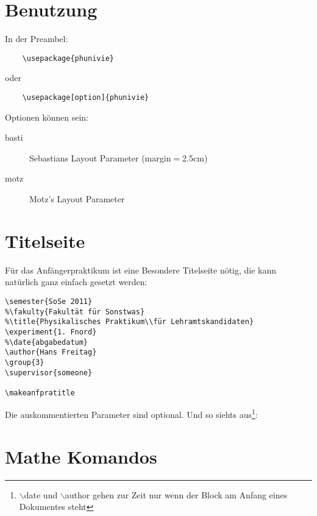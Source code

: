 \documentclass[a4paper]{article}
\begin{document}
\section{Benutzung}

In der Preambel:

\begin{verbatim}
	\usepackage{phunivie}
\end{verbatim}

oder

\begin{verbatim}
	\usepackage[option]{phunivie}
\end{verbatim}

Optionen können sein: 

\begin{description}
	\item[basti] Sebastians Layout Parameter (margin$=$2.5cm)
	\item[motz] Motz's Layout Parameter
\end{description}
	

\section{Titelseite}

Für das Anfängerpraktikum ist eine Besondere Titelseite nötig, die 
kann natürlich ganz einfach gesetzt werden:

\begin{verbatim}
\semester{SoSe 2011}
%\fakulty{Fakultät für Sonstwas}
%\title{Physikalisches Praktikum\\für Lehramtskandidaten}
\experiment{1. Fnord}
%\date{abgabedatum}
\author{Hans Freitag}
\group{3}
\supervisor{someone}

\makeanfpratitle
\end{verbatim}

Die auskommentierten Parameter sind optional. Und so siehts 
aus\footnote{$\backslash$date und $\backslash$author gehen zur Zeit nur wenn der Block am 
Anfang eines Dokumentes steht}:

\makeanfpratitle


\section{Mathe Komandos}
\end{document}
